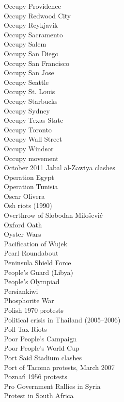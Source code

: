 Occupy Providence\\
Occupy Redwood City\\
Occupy Reykjavik\\
Occupy Sacramento\\
Occupy Salem\\
Occupy San Diego\\
Occupy San Francisco\\
Occupy San Jose\\
Occupy Seattle\\
Occupy St. Louis\\
Occupy Starbucks\\
Occupy Sydney\\
Occupy Texas State\\
Occupy Toronto\\
Occupy Wall Street\\
Occupy Windsor\\
Occupy movement\\
October 2011 Jabal al-Zawiya clashes\\
Operation Egypt\\
Operation Tunisia\\
Oscar Olivera\\
Osh riots (1990)\\
Overthrow of Slobodan Milošević\\
Oxford Oath\\
Oyster Wars\\
Pacification of Wujek\\
Pearl Roundabout\\
Peninsula Shield Force\\
People's Guard (Libya)\\
People's Olympiad\\
Persiankiwi\\
Phosphorite War\\
Polish 1970 protests\\
Political crisis in Thailand (2005–2006)\\
Poll Tax Riots\\
Poor People's Campaign\\
Poor People's World Cup\\
Port Said Stadium clashes\\
Port of Tacoma protests, March 2007\\
Poznań 1956 protests\\
Pro Government Rallies in Syria\\
Protest in South Africa\\

